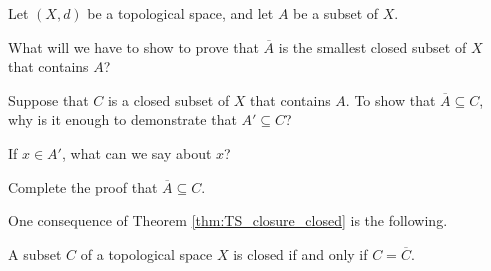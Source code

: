 \begin{activity} Let $(X,d)$ be a topological space, and let $A$ be a subset of $X$. 
\ba
\item What will we have to show to prove that $\overline{A}$ is the smallest closed subset of $X$ that contains $A$?

\item Suppose that $C$ is a closed subset of $X$ that contains $A$. To show that $\overline{A} \subseteq C$, why is it enough to demonstrate that $A' \subseteq C$? 

\item If $x \in A'$, what can we say about $x$? 

\item Complete the proof that $\overline{A} \subseteq C$.

\ea

\end{activity}

\begin{comment}

\ActivitySolution

\ba
\item We need to prove that any closed subset of $X$ that contains $A$ also contains $\overline{A}$.

\item Since $\overline{A} = A \cup A'$, if $C$ already contains $A$, then to show that $\overline{A} \subseteq C$, we only need to show that $A' \subseteq C$. 

\item If $x \in A'$, then $x$ is a limit point of $A$. That means that every neighborhood of $x$ in $X$ contains a point in $A$ different from $x$.

\item Let $x \in A'$, and let $N$ be a neighborhood of $x$. Then $N$ contains a point of $A$ different than $x$. Since $A \subseteq C$, it follows that $N$ contains a point of $C$ different than $x$. So $x$ is a limit point of $C$. The fact that $C$ is closed means that $C$ contains its limit points, so $x \in C$. Therefore, $A' \subseteq C$ and $\overline{A} \subseteq C$. 

\ea

\end{comment}

One consequence of Theorem \ref{thm:TS_closure_closed} is the following.

\begin{corollary} A subset $C$ of a topological space $X$ is closed if and only if $C = \overline{C}$. 
\end{corollary}

